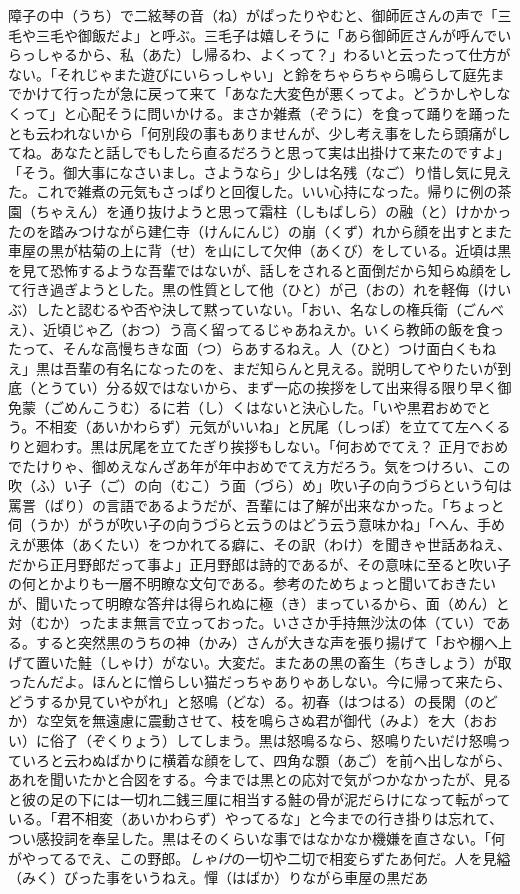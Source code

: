 \documentclass{book}
\begin{document}
障子の中（うち）で二絃琴の音（ね）がぱったりやむと、御師匠さんの声で「三毛や三毛や御飯だよ」と呼ぶ。三毛子は嬉しそうに「あら御師匠さんが呼んでいらっしゃるから、私（あた）し帰るわ、よくって？」わるいと云ったって仕方がない。「それじゃまた遊びにいらっしゃい」と鈴をちゃらちゃら鳴らして庭先までかけて行ったが急に戻って来て「あなた大変色が悪くってよ。どうかしやしなくって」と心配そうに問いかける。まさか雑煮（ぞうに）を食って踊りを踊ったとも云われないから「何別段の事もありませんが、少し考え事をしたら頭痛がしてね。あなたと話しでもしたら直るだろうと思って実は出掛けて来たのですよ」「そう。御大事になさいまし。さようなら」少しは名残（なご）り惜し気に見えた。これで雑煮の元気もさっぱりと回復した。いい心持になった。帰りに例の茶園（ちゃえん）を通り抜けようと思って霜柱（しもばしら）の融（と）けかかったのを踏みつけながら建仁寺（けんにんじ）の崩（くず）れから顔を出すとまた車屋の黒が枯菊の上に背（せ）を山にして欠伸（あくび）をしている。近頃は黒を見て恐怖するような吾輩ではないが、話しをされると面倒だから知らぬ顔をして行き過ぎようとした。黒の性質として他（ひと）が己（おの）れを軽侮（けいぶ）したと認むるや否や決して黙っていない。「おい、名なしの権兵衛（ごんべえ）、近頃じゃ乙（おつ）う高く留ってるじゃあねえか。いくら教師の飯を食ったって、そんな高慢ちきな面（つ）らあするねえ。人（ひと）つけ面白くもねえ」黒は吾輩の有名になったのを、まだ知らんと見える。説明してやりたいが到底（とうてい）分る奴ではないから、まず一応の挨拶をして出来得る限り早く御免蒙（ごめんこうむ）るに若（し）くはないと決心した。「いや黒君おめでとう。不相変（あいかわらず）元気がいいね」と尻尾（しっぽ）を立てて左へくるりと廻わす。黒は尻尾を立てたぎり挨拶もしない。「何おめでてえ？ 正月でおめでたけりゃ、御めえなんざあ年が年中おめでてえ方だろう。気をつけろい、この吹（ふ）い子（ご）の向（むこ）う面（づら）め」吹い子の向うづらという句は罵詈（ばり）の言語であるようだが、吾輩には了解が出来なかった。「ちょっと伺（うか）がうが吹い子の向うづらと云うのはどう云う意味かね」「へん、手めえが悪体（あくたい）をつかれてる癖に、その訳（わけ）を聞きゃ世話あねえ、だから正月野郎だって事よ」正月野郎は詩的であるが、その意味に至ると吹い子の何とかよりも一層不明瞭な文句である。参考のためちょっと聞いておきたいが、聞いたって明瞭な答弁は得られぬに極（き）まっているから、面（めん）と対（むか）ったまま無言で立っておった。いささか手持無沙汰の体（てい）である。すると突然黒のうちの神（かみ）さんが大きな声を張り揚げて「おや棚へ上げて置いた鮭（しゃけ）がない。大変だ。またあの黒の畜生（ちきしょう）が取ったんだよ。ほんとに憎らしい猫だっちゃありゃあしない。今に帰って来たら、どうするか見ていやがれ」と怒鳴（どな）る。初春（はつはる）の長閑（のどか）な空気を無遠慮に震動させて、枝を鳴らさぬ君が御代（みよ）を大（おおい）に俗了（ぞくりょう）してしまう。黒は怒鳴るなら、怒鳴りたいだけ怒鳴っていろと云わぬばかりに横着な顔をして、四角な顋（あご）を前へ出しながら、あれを聞いたかと合図をする。今までは黒との応対で気がつかなかったが、見ると彼の足の下には一切れ二銭三厘に相当する鮭の骨が泥だらけになって転がっている。「君不相変（あいかわらず）やってるな」と今までの行き掛りは忘れて、つい感投詞を奉呈した。黒はそのくらいな事ではなかなか機嫌を直さない。「何がやってるでえ、この野郎。\emph{しゃけ}の一切や二切で相変らずたあ何だ。人を見縊（みく）びった事をいうねえ。憚（はばか）りながら車屋の黒だあ
\end{document}
